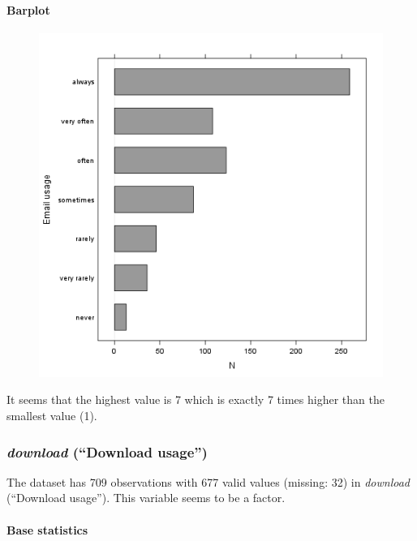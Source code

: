 \documentclass{article}
\makeatletter
\def\maxwidth{\ifdim\Gin@nat@width>\linewidth\linewidth
\else\Gin@nat@width\fi}
\let\Oldincludegraphics\includegraphics
\renewcommand{\includegraphics}[1]{\Oldincludegraphics[width=\maxwidth]{#1}}
\makeatother
\begin{document}
\paragraph{Barplot}

\begin{figure}[htbp]
\centering
\includegraphics{895cde198b269bf65b01e1e067a515c8.png}
\caption{}
\end{figure}

It seems that the highest value is 7 which is exactly 7 times higher
than the smallest value (1).

\subsubsection{\emph{download} (``Download usage'')}

The dataset has 709 observations with 677 valid values (missing: 32) in
\emph{download} (``Download usage''). This variable seems to be a
factor.

\paragraph{Base statistics}
\end{document}

